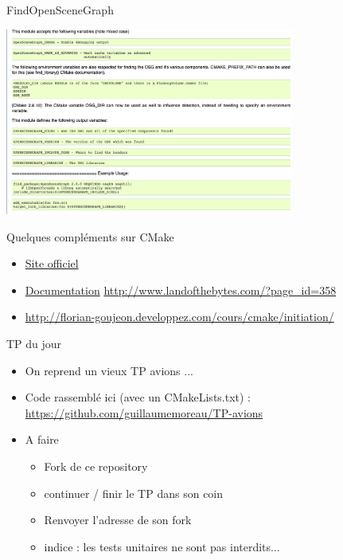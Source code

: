 \begin{frame}{FindOpenSceneGraph}
\begin{center}
\includegraphics[width=9.5cm]{fig/FindOpenSceneGraph.png}

\end{center}\end{frame}

\begin{frame}{Quelques compléments sur CMake}

\begin{itemize}
\itemsep1pt\parskip0pt
\item \href{http://www.cmake.org}{Site officiel}
\item \href{http://www.cmake.org/documentation/}{Documentation}
  \url{http://www.landofthebytes.com/?page\_id=358}
\item \url{http://florian-goujeon.developpez.com/cours/cmake/initiation/}
\end{itemize}

\end{frame}

\begin{frame}{TP du jour}
\begin{itemize}
\item On reprend un vieux  TP avions ...
\item Code rassemblé ici (avec un CMakeLists.txt) : \url{https://github.com/guillaumemoreau/TP-avions}
\item A faire
\begin{itemize}
\item Fork de ce repository
\item continuer / finir le TP dans son coin
\item Renvoyer l'adresse de son fork
\item indice : les tests unitaires ne sont pas interdits...
\end{itemize}
\end{itemize}
\end{frame}
